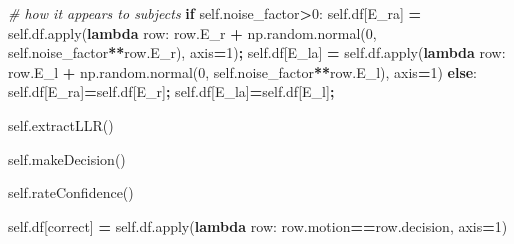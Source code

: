 \documentclass[12pt,twoside]{reedthesis}
\newenvironment{Shaded}{\begin{snugshade}}{\end{snugshade}}
\newcommand{\BuiltInTok}[1]{#1}
\newcommand{\CommentTok}[1]{\textcolor[rgb]{0.56,0.35,0.01}{\textit{#1}}}
\newcommand{\ControlFlowTok}[1]{\textcolor[rgb]{0.13,0.29,0.53}{\textbf{#1}}}
\newcommand{\DecValTok}[1]{\textcolor[rgb]{0.00,0.00,0.81}{#1}}
\newcommand{\KeywordTok}[1]{\textcolor[rgb]{0.13,0.29,0.53}{\textbf{#1}}}
\newcommand{\NormalTok}[1]{#1}
\newcommand{\OperatorTok}[1]{\textcolor[rgb]{0.81,0.36,0.00}{\textbf{#1}}}
\newcommand{\StringTok}[1]{\textcolor[rgb]{0.31,0.60,0.02}{#1}}
\newcommand{\VariableTok}[1]{\textcolor[rgb]{0.00,0.00,0.00}{#1}}
\begin{document}
\begin{Shaded}
\begin{Highlighting}[]
        \CommentTok{\# how it appears to subjects}
        \ControlFlowTok{if} \VariableTok{self}\NormalTok{.noise\_factor}\OperatorTok{\textgreater{}}\DecValTok{0}\NormalTok{:}
          \VariableTok{self}\NormalTok{.df[}\StringTok{\textquotesingle{}E\_ra\textquotesingle{}}\NormalTok{] }\OperatorTok{=} \VariableTok{self}\NormalTok{.df.}\BuiltInTok{apply}\NormalTok{(}\KeywordTok{lambda}\NormalTok{ row: row.E\_r }\OperatorTok{+}
\NormalTok{                        np.random.normal(}\DecValTok{0}\NormalTok{, }\VariableTok{self}\NormalTok{.noise\_factor}\OperatorTok{**}\NormalTok{row.E\_r), }
\NormalTok{                        axis}\OperatorTok{=}\DecValTok{1}\NormalTok{)}\OperatorTok{;}
          \VariableTok{self}\NormalTok{.df[}\StringTok{\textquotesingle{}E\_la\textquotesingle{}}\NormalTok{] }\OperatorTok{=} \VariableTok{self}\NormalTok{.df.}\BuiltInTok{apply}\NormalTok{(}\KeywordTok{lambda}\NormalTok{ row: row.E\_l }\OperatorTok{+}
\NormalTok{                        np.random.normal(}\DecValTok{0}\NormalTok{, }\VariableTok{self}\NormalTok{.noise\_factor}\OperatorTok{**}\NormalTok{row.E\_l), }
\NormalTok{                        axis}\OperatorTok{=}\DecValTok{1}\NormalTok{)}
        \ControlFlowTok{else}\NormalTok{:}
          \VariableTok{self}\NormalTok{.df[}\StringTok{\textquotesingle{}E\_ra\textquotesingle{}}\NormalTok{]}\OperatorTok{=}\VariableTok{self}\NormalTok{.df[}\StringTok{\textquotesingle{}E\_r\textquotesingle{}}\NormalTok{]}\OperatorTok{;}
          \VariableTok{self}\NormalTok{.df[}\StringTok{\textquotesingle{}E\_la\textquotesingle{}}\NormalTok{]}\OperatorTok{=}\VariableTok{self}\NormalTok{.df[}\StringTok{\textquotesingle{}E\_l\textquotesingle{}}\NormalTok{]}\OperatorTok{;}

        \VariableTok{self}\NormalTok{.extractLLR()}

        \VariableTok{self}\NormalTok{.makeDecision()}

        \VariableTok{self}\NormalTok{.rateConfidence()}
        
        \VariableTok{self}\NormalTok{.df[}\StringTok{\textquotesingle{}correct\textquotesingle{}}\NormalTok{] }\OperatorTok{=} 
          \VariableTok{self}\NormalTok{.df.}\BuiltInTok{apply}\NormalTok{(}\KeywordTok{lambda}\NormalTok{ row: }
\NormalTok{            row.motion}\OperatorTok{==}\NormalTok{row.decision, axis}\OperatorTok{=}\DecValTok{1}\NormalTok{)}


\end{Highlighting}
\end{Shaded}
\end{document}
